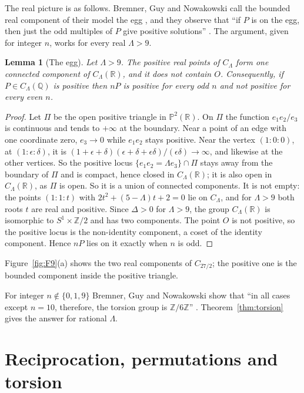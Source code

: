 \documentclass[11pt]{amsart}
\newtheorem{lemma}[theorem]{Lemma}
\theoremstyle{definition}
\theoremstyle{remark}
\newcommand{\Q}{\mathbb{Q}}
\newcommand{\R}{\mathbb{R}}
\newcommand{\Z}{\mathbb{Z}}
\newcommand{\PP}{\mathbb{P}}
\begin{document}
The real picture is as follows. Bremner, Guy and Nowakowski call the bounded real component of their model the egg \cite[p.~118]{bgn1993}, and they observe that ``if $P$ is on the egg, then just the odd multiples of $P$ give positive solutions'' \cite[p.~119]{bgn1993}. The argument, given for integer $n$, works for every real $\Lambda>9$.

\begin{lemma}[The egg]\label{lem:egg}
Let $\Lambda>9$. The positive real points of $C_\Lambda$ form one connected component of $C_\Lambda(\R)$, and it does not contain $O$. Consequently, if $P\in C_\Lambda(\Q)$ is positive then $nP$ is positive for every odd $n$ and not positive for every even $n$.
\end{lemma}

\begin{proof}
Let $\Pi$ be the open positive triangle in $\PP^2(\R)$. On $\Pi$ the function $e_1e_2/e_3$ is continuous and tends to $+\infty$ at the boundary. Near a point of an edge with one coordinate zero, $e_3\to0$ while $e_1e_2$ stays positive. Near the vertex $(1:0:0)$, at $(1:\epsilon:\delta)$, it is $(1+\epsilon+\delta)(\epsilon+\delta+\epsilon\delta)/(\epsilon\delta)\to\infty$, and likewise at the other vertices. So the positive locus $\{e_1e_2=\Lambda e_3\}\cap\Pi$ stays away from the boundary of $\Pi$ and is compact, hence closed in $C_\Lambda(\R)$; it is also open in $C_\Lambda(\R)$, as $\Pi$ is open. So it is a union of connected components. It is not empty: the points $(1:1:t)$ with $2t^2+(5-\Lambda)t+2=0$ lie on $C_\Lambda$, and for $\Lambda>9$ both roots $t$ are real and positive. Since $\Delta>0$ for $\Lambda>9$, the group $C_\Lambda(\R)$ is isomorphic to $S^1\times\Z/2$ and has two components. The point $O$ is not positive, so the positive locus is the non-identity component, a coset of the identity component. Hence $nP$ lies on it exactly when $n$ is odd.
\end{proof}

Figure~\ref{fig:F9}(a) shows the two real components of $C_{27/2}$; the positive one is the bounded component inside the positive triangle.

For integer $n\notin\{0,1,9\}$ Bremner, Guy and Nowakowski show that ``in all cases except $n=10$, therefore, the torsion group is $\Z/6\Z$'' \cite[\S4, p.~120]{bgn1993}. Theorem~\ref{thm:torsion} gives the answer for rational $\Lambda$.

\section{Reciprocation, permutations and torsion}\label{sec:dual}
\end{document}
